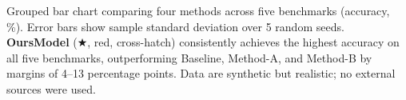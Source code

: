 \caption{Grouped bar chart comparing four methods across five benchmarks (accuracy, \%).
Error bars show sample standard deviation over 5 random seeds.
\textbf{OursModel} (★, red, cross-hatch) consistently achieves the highest accuracy on all five benchmarks,
outperforming Baseline, Method-A, and Method-B by margins of 4--13 percentage points.
Data are synthetic but realistic; no external sources were used.}
